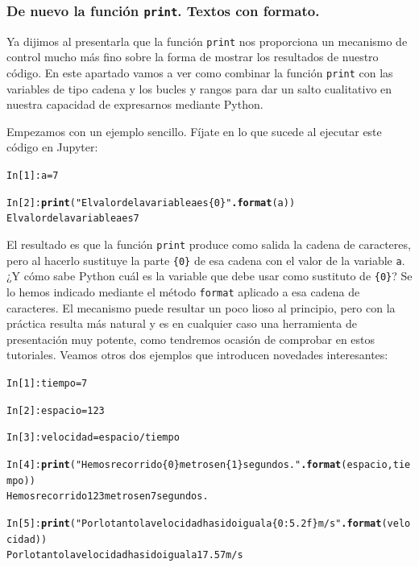 \documentclass[10pt,a4paper]{article}\usepackage[]{graphicx}\usepackage[]{color}
\makeatletter
\newcommand{\hlstr}[1]{\textcolor[rgb]{0.192,0.494,0.8}{#1}}%
\newcommand{\hlkwd}[1]{\textcolor[rgb]{0.737,0.353,0.396}{\textbf{#1}}}%
\newenvironment{kframe}{%
 \def\at@end@of@kframe{}%
 \ifinner\ifhmode%
  \def\at@end@of@kframe{\end{minipage}}%
  \begin{minipage}{\columnwidth}%
 \fi\fi%
 \def\FrameCommand##1{\hskip\@totalleftmargin \hskip-\fboxsep
 \colorbox{shadecolor}{##1}\hskip-\fboxsep
     \hskip-\linewidth \hskip-\@totalleftmargin \hskip\columnwidth}%
 \MakeFramed {\advance\hsize-\width
   \@totalleftmargin\z@ \linewidth\hsize
   \@setminipage}}%
 {\par\unskip\endMakeFramed%
 \at@end@of@kframe}
\newenvironment{knitrout}{}{} %
\newcounter {cont01}
\makeatother
\begin{document}
\subsubsection*{De nuevo la función {\tt print}. Textos con formato.}
\label{tut02:subsubsec:funcionPrintTextosFormato}

Ya dijimos al presentarla que la función {\tt print} nos proporciona un mecanismo de control mucho más fino sobre la forma de mostrar los resultados de nuestro código. En este apartado vamos a ver como combinar la función {\tt print} con las variables de tipo cadena y los bucles y rangos para dar un salto cualitativo en nuestra capacidad de expresarnos mediante Python.

Empezamos con un ejemplo sencillo. Fíjate en lo que sucede al ejecutar este código en Jupyter:
\begin{knitrout}
\color{fgcolor}\begin{kframe}
\begin{alltt}
In [1]: a = 7

In [2]: \hlkwd{print}(\hlstr{"El valor de la variable a es  \{0\}"}\hlkwd{.format}(a))
El valor de la variable a es  7
\end{alltt}
\end{kframe}
\end{knitrout}
El resultado es que la función {\tt print} produce como salida la cadena de caracteres, pero al hacerlo sustituye la parte {\tt\{0\}} de esa cadena  con el valor de la variable {\tt a}. ¿Y cómo sabe Python cuál es la variable que debe usar como sustituto de {\tt\{0\}}? Se lo hemos indicado mediante el método {\tt format} aplicado a esa cadena de caracteres.
El mecanismo puede resultar un poco lioso al principio, pero con la práctica resulta más natural y es en cualquier caso una herramienta de presentación muy potente, como tendremos ocasión de comprobar en estos tutoriales. Veamos otros dos ejemplos que introducen novedades interesantes:
\begin{knitrout}
\color{fgcolor}\begin{kframe}
\begin{alltt}
In [1]: tiempo = 7

In [2]: espacio = 123

In [3]: velocidad = espacio / tiempo

In [4]: \hlkwd{print}(\hlstr{"Hemos recorrido \{0\} metros en \{1\} segundos."}\hlkwd{.format}(espacio, tiempo))
Hemos recorrido 123 metros en 7 segundos.

In [5]: \hlkwd{print}(\hlstr{"Por lo tanto la velocidad ha sido igual a \{0:5.2f\} m/s"}\hlkwd{.format}(velocidad))
Por lo tanto la velocidad ha sido igual a 17.57 m/s
\end{alltt}
\end{kframe}
\end{knitrout}
\end{document}
